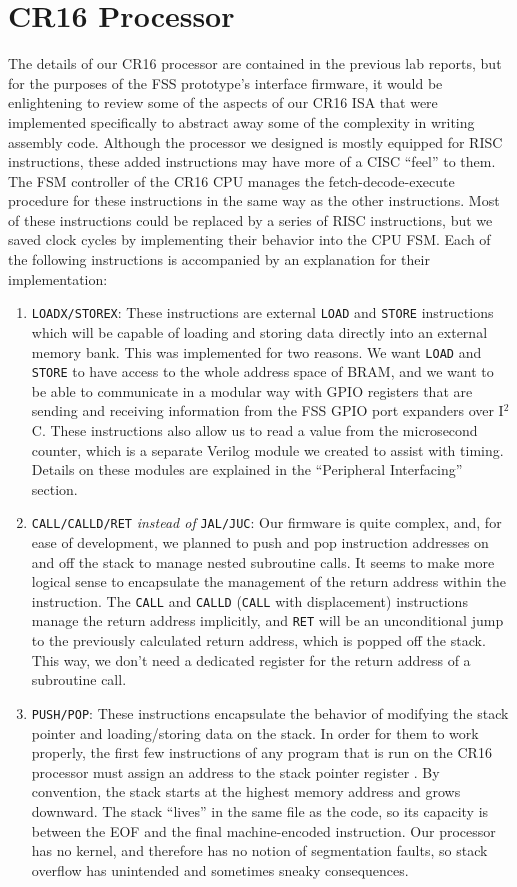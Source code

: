 \documentclass[conference]{IEEEtran}
\begin{document}
\section{CR16 Processor}
The details of our CR16 processor are contained in the previous lab reports, but for the purposes of the FSS prototype's interface firmware, it would be enlightening to review some of the aspects of our CR16 ISA that were implemented specifically to abstract away some of the complexity in writing assembly code. Although the processor we designed is mostly equipped for RISC instructions, these added instructions may have more of a CISC ``feel'' to them. The FSM controller of the CR16 CPU manages the fetch-decode-execute procedure for these instructions in the same way as the other instructions. Most of these instructions could be replaced by a series of RISC instructions, but we saved clock cycles by implementing their behavior into the CPU FSM. Each of the following instructions is accompanied by an explanation for their implementation:
\begin{enumerate}
    \item \verb|LOADX/STOREX|: These instructions are external \verb|LOAD| and \verb|STORE| instructions which will be capable of loading and storing data directly into an external memory bank. This was implemented for two reasons. We want \verb|LOAD| and \verb|STORE| to have access to the whole address space of BRAM, and we want to be able to communicate in a modular way with GPIO registers that are sending and receiving information from the FSS GPIO port expanders over I$^2$C. These instructions also allow us to read a value from the microsecond counter, which is a separate Verilog module we created to assist with timing. Details on these modules are explained in the ``Peripheral Interfacing'' section.
    \item \verb|CALL/CALLD/RET| \textit{instead of} \verb|JAL/JUC|: Our firmware is quite complex, and, for ease of development, we planned to push and pop instruction addresses on and off the stack to manage nested subroutine calls. It seems to make more logical sense to encapsulate the management of the return address within the instruction. The \verb|CALL| and \verb|CALLD| (\verb|CALL| with displacement) instructions manage the return address implicitly, and \verb|RET| will be an unconditional jump to the previously calculated return address, which is popped off the stack. This way, we don't need a dedicated register for the return address of a subroutine call.
    \item \verb|PUSH/POP|: These instructions encapsulate the behavior of modifying the stack pointer and loading/storing data on the stack. In order for them to work properly, the first few instructions of any program that is run on the CR16 processor must assign an address to the stack pointer register . By convention, the stack starts at the highest memory address and grows downward. The stack ``lives'' in the same file as the code, so its capacity is between the EOF and the final machine-encoded instruction. Our processor has no kernel, and therefore has no notion of segmentation faults, so stack overflow has unintended and sometimes sneaky consequences.
\end{enumerate}
\end{document}
